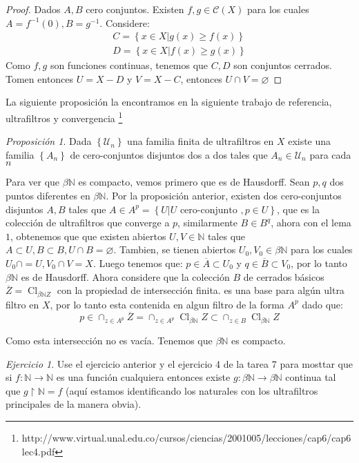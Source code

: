 \documentclass[11pt,a4paper,draft]{article}
\theoremstyle{definition}
\theoremstyle{remark}
\newtheorem{exc}{Ejercicio}
\newtheorem{prop}{Proposición}
\newcommand{\set}[1]{\left\lbrace #1 \right\rbrace}
\begin{document}
\begin{proof}
	Dados $ A,B $ cero conjuntos. Existen $ f,g \in \mathcal{C}(X) $ para los cuales $ A = f^{-1}(0), B = g^{-1} $. Considere:
	\begin{align}
	C = \set{x \in X | g(x) \geq f(x)} \\
	D = \set{x \in X | f(x) \geq g(x)}
	\end{align}
	Como $ f,g $ son funciones continuas, tenemos que $ C,D $ son conjuntos cerrados. Tomen entonces $ U = X - D $ y $ V = X - C $, entonces $ U \cap V = \varnothing $
\end{proof}

La siguiente proposición la encontramos en la siguiente trabajo de referencia, ultrafiltros y convergencia \footnote{http://www.virtual.unal.edu.co/cursos/ciencias/2001005/lecciones/cap6/cap6lec4.pdf}
\begin{prop}
	Dada $ \set{\mathcal{U}_n} $ una familia finita de ultrafiltros en $ X $ existe una familia $ \set{A_n} $ de cero-conjuntos disjuntos dos a dos tales que $ A_n \in \mathcal{U}_n $ para cada $ n $
\end{prop}

Para ver que $ \beta \mathbb{N} $ es compacto, vemos primero que es de Hausdorff. Sean $ p,q $ dos puntos diferentes en $ \beta \mathbb{N} $. Por la proposición anterior, existen dos cero-conjuntos disjuntos $ A,B $ tales que $ A \in A^p =   \set{ U | U \textrm{ cero-conjunto }, p \in U  }  $, que es la colección de ultrafiltros que converge a $ p $, similarmente $ B \in B^q $, ahora con el lema $ 1 $, obtenemos que que existen abiertos $ U,V \in \mathbb{N} $ tales que $  A \subset U, B \subset B, U \cap B = \varnothing $. Tambien, se tienen abiertos $ U_0, V_0 \in \beta\mathbb{N} $ para los cuales $ U_0 \cap = U, V_0 \cap V = X $. Luego tenemos que:
$ p \in \overline{A} \subset U_0 $ y $ q \in \overline{B} \subset V_0 $, por lo tanto $ \beta \mathbb{N} $ es de Hausdorff.
Ahora considere que la colección $ B  $ de cerrados básicos $ \overline{Z} = \operatorname{Cl}_{\beta \mathbb{N} Z} $ con la propiedad de intersección finita. es una base para algún ultra filtro en $ X $, por lo tanto esta contenida en algun filtro de la forma $ A^p $ dado que:
\[ p \in \cap_{z \in A^p} \overline{Z} = \cap_{z \in A^p } \operatorname{Cl}_{\beta \mathbb{N} } Z \subset \cap_{z \in B} \operatorname{Cl}_{\beta \mathbb{N}} Z \]
		
Como esta intersección no es vacía. Tenemos que $ \beta \mathbb{N} $ es compacto.
\begin{exc}
	Use el ejercicio anterior y el ejercicio 4 de la tarea 7 para mosttar que si $ f : \mathbb{N} \to \mathbb{N} $ es una función cualquiera entonces existe $ g : \beta\mathbb{N} \to \beta\mathbb{N} $ continua tal que $ g \upharpoonright \mathbb{N} = f $ (aquí estamos identificando los naturales con los ultrafiltros principales de la manera obvia).
\end{exc}
\end{document}
